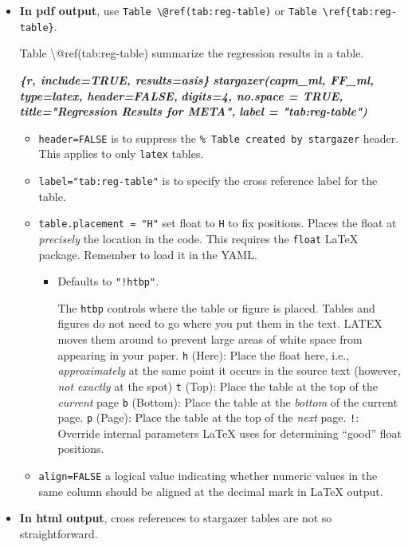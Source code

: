\documentclass[
  a4paper,
  twoside,
  openright]{book}
\newenvironment{Shaded}{\begin{snugshade}}{\end{snugshade}}
\newcommand{\InformationTok}[1]{\textcolor[rgb]{0.56,0.35,0.01}{\textbf{\textit{#1}}}}
\newcommand{\NormalTok}[1]{#1}
\theoremstyle{definition}
\theoremstyle{definition}
\theoremstyle{definition}
\theoremstyle{definition}
\theoremstyle{remark}
\begin{document}
\begin{itemize}
\item
  \textbf{In pdf output}, use \texttt{Table\ \textbackslash{}@ref(tab:reg-table)} or \texttt{Table\ \textbackslash{}ref\{tab:reg-table\}}.

\begin{Shaded}
\begin{Highlighting}[]
\NormalTok{Table \textbackslash{}@ref(tab:reg{-}table) summarize the regression results in a table.}

\InformationTok{\textasciigrave{}\textasciigrave{}\textasciigrave{}\{r, include=TRUE, results=\textquotesingle{}asis\textquotesingle{}\}}
\InformationTok{stargazer(capm\_ml, FF\_ml, type=\textquotesingle{}latex\textquotesingle{}, header=FALSE,}
\InformationTok{          digits=4, no.space = TRUE,}
\InformationTok{          title="Regression Results for META",}
\InformationTok{          label = "tab:reg{-}table")}
\InformationTok{\textasciigrave{}\textasciigrave{}\textasciigrave{}}
\end{Highlighting}
\end{Shaded}

  \begin{itemize}
  \item
    {\texttt{header=FALSE}} is to suppress the \texttt{\%\ Table\ created\ by\ stargazer} header. This applies to only \texttt{latex} tables.
  \item
    \texttt{label="tab:reg-table"} is to specify the cross reference label for the table.
  \item
    {\texttt{table.placement\ =\ "H"}} set float to \texttt{H} to fix positions. Places the float at \emph{precisely} the location in the code. This requires the {\texttt{float}} LaTeX package. Remember to load it in the YAML.

    \begin{itemize}
    \item
      Defaults to \texttt{"!htbp"}.

      The \texttt{htbp} controls where the table or figure is placed. Tables and figures do not need to go where you put them in the text. LATEX moves them around to prevent large areas of white space from appearing in your paper.
      \texttt{h} (Here): Place the float here, i.e., \emph{approximately} at the same point it occurs in the source text (however, \emph{not exactly} at the spot)
      \texttt{t} (Top): Place the table at the top of the \emph{current} page
      \texttt{b} (Bottom): Place the table at the \emph{bottom} of the current page.
      \texttt{p} (Page): Place the table at the top of the \emph{next} page.
      \texttt{!}: Override internal parameters LaTeX uses for determining ``good'' float positions.
    \end{itemize}
  \item
    \texttt{align=FALSE} a logical value indicating whether numeric values in the same column should be aligned at the decimal mark in LaTeX output.
  \end{itemize}
\item
  \textbf{In html output}, cross references to stargazer tables are not so straightforward.


\end{itemize}
\end{document}
